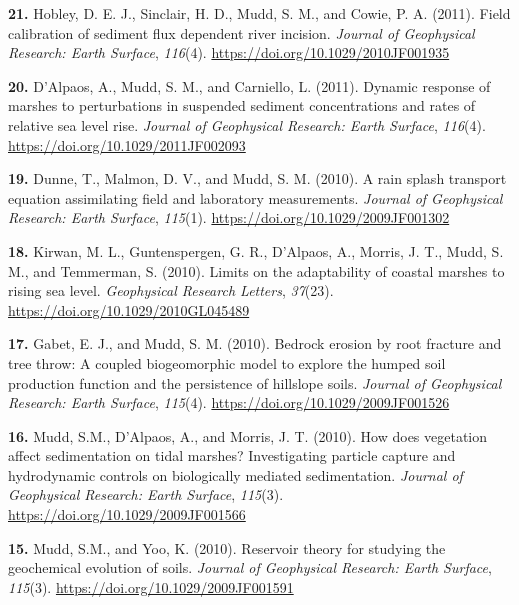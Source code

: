 \documentclass[10pt, a4paper]{article}
\newcommand{\years}[1]{\marginnote{\scriptsize #1}}
\begin{document}
\years{2011}\hangindent=0.7cm\textbf{21. }Hobley, D. E. J., Sinclair, H. D., Mudd, S. M., and Cowie, P. A. (2011). Field calibration of sediment flux dependent river incision. \textit{Journal of Geophysical Research: Earth Surface}, \textit{116}(4). \href{https://doi.org/10.1029/2010JF001935}{https://doi.org/10.1029/2010JF001935}\par
\years{2011}\hangindent=0.7cm\textbf{20. }D'Alpaos, A., Mudd, S. M., and Carniello, L. (2011). Dynamic response of marshes to perturbations in suspended sediment concentrations and rates of relative sea level rise. \textit{Journal of Geophysical Research: Earth Surface}, \textit{116}(4). \href{https://doi.org/10.1029/2011JF002093}{https://doi.org/10.1029/2011JF002093}\par

\years{2010}\hangindent=0.7cm\textbf{19. }Dunne, T., Malmon, D. V., and Mudd, S. M. (2010). A rain splash transport equation assimilating field and laboratory measurements. \textit{Journal of Geophysical Research: Earth Surface}, \textit{115}(1). \href{https://doi.org/10.1029/2009JF001302}{https://doi.org/10.1029/2009JF001302}\par
\years{2010}\hangindent=0.7cm\textbf{18. }Kirwan, M. L., Guntenspergen, G. R., D'Alpaos, A., Morris, J. T., Mudd, S. M., and Temmerman, S. (2010). Limits on the adaptability of coastal marshes to rising sea level. \textit{Geophysical Research Letters}, \textit{37}(23). \href{https://doi.org/10.1029/2010GL045489}{https://doi.org/10.1029/2010GL045489}\par
\years{2010}\hangindent=0.7cm\textbf{17. }Gabet, E. J., and Mudd, S. M. (2010). Bedrock erosion by root fracture and tree throw: A coupled biogeomorphic model to explore the humped soil production function and the persistence of hillslope soils. \textit{Journal of Geophysical Research: Earth Surface}, \textit{115}(4). \href{https://doi.org/10.1029/2009JF001526}{https://doi.org/10.1029/2009JF001526}\par
\years{2010}\hangindent=0.7cm\textbf{16. }Mudd, S.M., D'Alpaos, A., and Morris, J. T. (2010). How does vegetation affect sedimentation on tidal marshes? Investigating particle capture and hydrodynamic controls on biologically mediated sedimentation. \textit{Journal of Geophysical Research: Earth Surface}, \textit{115}(3). \href{https://doi.org/10.1029/2009JF001566}{https://doi.org/10.1029/2009JF001566}\par
\years{2010}\hangindent=0.7cm\textbf{15. }Mudd, S.M., and Yoo, K. (2010). Reservoir theory for studying the geochemical evolution of soils. \textit{Journal of Geophysical Research: Earth Surface}, \textit{115}(3). \href{https://doi.org/10.1029/2009JF001591}{https://doi.org/10.1029/2009JF001591}\par
\end{document}
